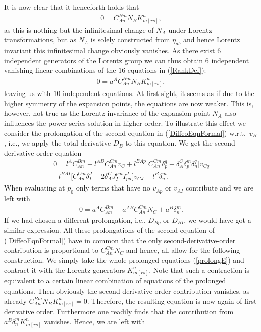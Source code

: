 It is now clear that it henceforth holds that
\begin{align}
    0 = C^{Bm}_{An}N_B K_{m[rs]}^n,
\end{align}
as this is nothing but the infinitesimal change of $N_A$ under Lorentz transformations, but as $N_A$ is solely constructed from $\eta_{ab}$ and hence Lorentz invariant this infinitesimal change obviously vanishes. As there exist $6$ independent generators of the Lorentz group we can thus obtain $6$ independent vanishing linear combinations of the $16$ equations in (\ref{RankDef}):
\begin{align}
    0 = a^A C^{Bm}_{An}N_B K_{m[rs]}^n,
\end{align}
leaving us with $10$ independent equations. At first sight, it seems as if due to the higher symmetry of the expansion points, the equations are now weaker. This is, however, not true as the Lorentz invariance of the expansion point $N_A$ also influences the power series solution in higher order. To illustrate this effect we consider the prolongation of the second equation in (\ref{DiffeoEqnFormal}) w.r.t.\ $v_B$, i.e., we apply the total derivative $D_B$ to this equation. We get the second-derivative-order equation
\begin{multline}
    0 = l^AC_{An}^{Bm} + l^{AB}C_{An}^{Cm}v_C + l^{BAp} \bigl[ C_{An}^{Cm} \delta_p^q - \delta_A^C \delta_p^m \delta^q_n \bigr] v_{Cq}\\
    + l^{BAI} \bigl[ C_{An}^{Cm} \delta_I^J - 2 \delta_A^C J_I^{pm} I^J_{pn}  \bigr] v_{CJ} + l^{B} \delta^m_n.
\end{multline}
When evaluating at $p_0$ only terms that have no $v_{Ap}$ or $v_{AI}$ contribute and we are left with
\begin{align}\label{prolongE}
    0 = a^A C_{An}^{Bm} + a^{AB} C_{An}^{Cm} N_C +  a^B \delta^m_n.
\end{align}
If we had chosen a different prolongation, i.e., $D_{Bp}$ or $D_{BI}$, we would have got a similar expression. All these prolongations of the second equation of (\ref{DiffeoEqnFormal}) have in common that the only second-derivative-order contribution is proportional to $C^{Cm}_{An} N_C$ and hence, all allow for the following construction. We simply take the whole prolonged equations (\ref{prolongE}) and contract it with the Lorentz generators $K_{m[rs]}^n$. Note that such a contraction is equivalent to a certain linear combination of equations of the prolonged equations. Then obviously the second-derivative-order contribution vanishes, as already $C_{An}^{Bm} N_B K_{m[rs]}^n = 0$.  Therefore, the resulting equation is now again of first derivative order. Furthermore one readily finds that the contribution from $a^B \delta^m_n K_{m[rs]}^n$ vanishes. Hence, we are left with 
